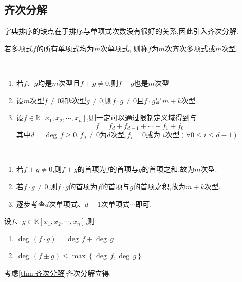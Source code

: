 \subsection{齐次分解}
字典排序的缺点在于排序与单项式次数没有很好的关系,因此引入齐次分解.
\begin{formal}
\begin{definition}[齐次多项式]\label{def:齐次多项式}
    若多项式$f$的所有单项式均为$m$次单项式,
    则称$f$为$m$次齐次多项式或$m$次型.
\end{definition}
\end{formal}
\begin{formal}
    \begin{theorem}[齐次分解]\label{thm:齐次分解}
        \,
        \begin{enumerate}[label = {\textup{(\arabic*)}}]
            \item 若$f$、$g$均是$m$次型且$f+g\neq 0$,则$f+g$也是$m$次型
            \item 设$m$次型$f\neq 0 $和$k$次型$g\neq 0$,则$f\cdot g\neq 0$且$f\cdot g$是$m+k$次型
            \item 设$f\in\mathbb{K}\left[x_1,x_2,\cdots,x_n\right]$,则一定可以通过限制定义域得到与\[
            f=f_d+f_{d-1}+ \cdots+f_1+f_0
            \]
            其中$d=\deg\,f\geqslant 0,f_d\neq 0$为$d$次型,$f_i=0$或为 $i$次型$\left(\forall 0\leqslant i\leqslant d-1\right)$
        \end{enumerate}
    \end{theorem}
    \begin{Proof}
        \,
        \begin{enumerate}[label = {\textup{(\arabic*)}}]
            \item 若$f+g\neq 0$,则$f+g$的首项为$f$的首项与$g$的首项之和,故为$m$次型.
            \item 若$f\cdot g\neq 0$,则$f\cdot g$的首项为$f$的首项与$g$的首项之积,故为$m+k$次型.
            \item 逐步考查$d$次单项式、$d-1$次单项式$\cdots$即可.\qedhere
        \end{enumerate}
    \end{Proof}
\end{formal}
\begin{green}
\begin{lemma}[多元多项式运算的次数]\label{lem:多元多项式运算的次数}
    设$f$、$g\in\mathbb{K}\left[x_1,x_2,\cdots,x_n\right]$,则
    \begin{enumerate}[label = {\textup{(\arabic*)}}]
        \item  $\deg\,\left(f\cdot g\right)=\deg\,f+\deg\,g$
        \item $\deg \,\left(
            f\pm g
        \right)\leqslant \max\left\{
            \deg\,f,\deg\,g\right\}$
    \end{enumerate}
\end{lemma}
\begin{Proof}
考虑\cref{thm:齐次分解}齐次分解立得.\qedhere
\end{Proof}
\end{green}
